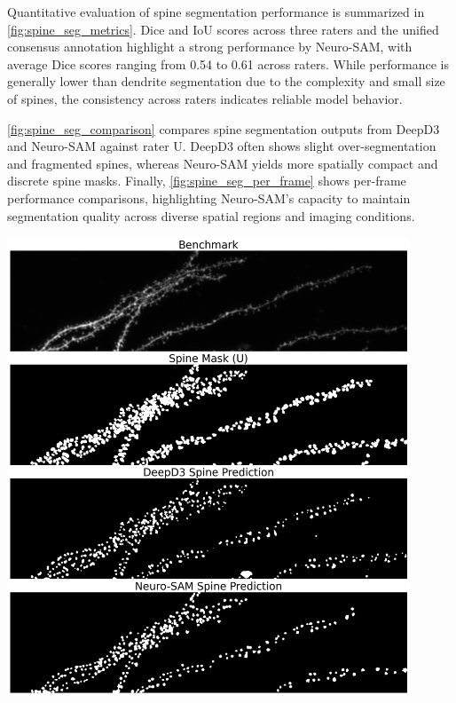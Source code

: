 Quantitative evaluation of spine segmentation performance is summarized in \autoref{fig:spine_seg_metrics}. Dice and \gls{IoU} scores across three raters and the unified consensus annotation highlight a strong performance by Neuro-\gls{SAM}, with average Dice scores ranging from 0.54 to 0.61 across raters. While performance is generally lower than dendrite segmentation due to the complexity and small size of spines, the consistency across raters indicates reliable model behavior.

\autoref{fig:spine_seg_comparison} compares spine segmentation outputs from \gls{DeepD3} and Neuro-\gls{SAM} against rater U. \gls{DeepD3} often shows slight over-segmentation and fragmented spines, whereas Neuro-\gls{SAM} yields more spatially compact and discrete spine masks. Finally, \autoref{fig:spine_seg_per_frame} shows per-frame performance comparisons, highlighting Neuro-\gls{SAM}’s capacity to maintain segmentation quality across diverse spatial regions and imaging conditions.


\begin{center}
\includegraphics[width=0.9\textwidth]{figures/41_spine_seg_comparison.png}
\label{fig:spine_seg_comparison}
\end{center}


